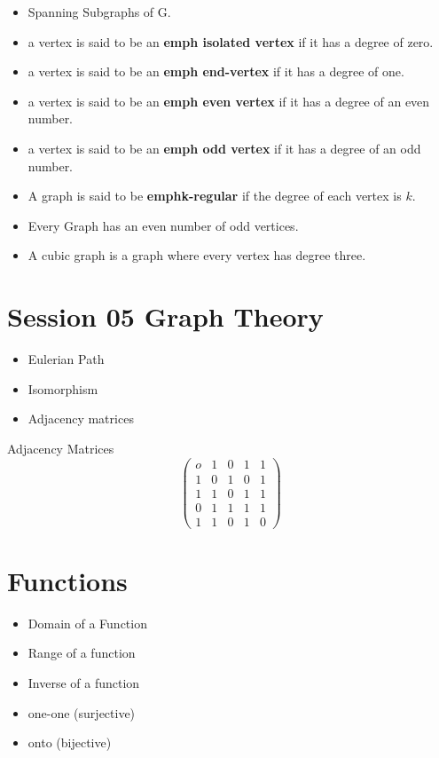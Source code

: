 \documentclass{article}
\begin{document}
\begin{itemize}
\item Spanning Subgraphs of G.

\item a vertex is said to be an \textbf{emph{ isolated vertex}} if it has a degree of zero.
\item a vertex is said to be an \textbf{emph{ end-vertex}} if it has a degree of one.
\item a vertex is said to be an \textbf{emph{ even vertex}} if it has a degree of an even number.
\item a vertex is said to be an \textbf{emph{ odd vertex}} if it has a degree of an odd number.


\item A graph is said to be \textbf{emph{k-regular}} if the degree of each vertex is $k$. 
\item Every Graph has an even number of odd vertices.
\item A cubic graph is a graph where every vertex has degree three.
\end{itemize}



\section*{Session 05 Graph Theory}
\begin{itemize}
\item Eulerian Path
\item Isomorphism
\item Adjacency matrices
\end{itemize}
Adjacency Matrices
\[ \left( \begin{matrix}
o & 1 & 0 & 1 & 1 \\ 
1 & 0 & 1 & 0 & 1 \\ 
1 & 1 & 0 & 1 & 1 \\ 
0 & 1 & 1 & 1 & 1 \\ 
1 & 1 & 0 & 1 & 0
\end{matrix} \right) \]

\section*{Functions}
\begin{itemize}
\item Domain of a Function
\item Range of a function
\item Inverse of a function
\end{itemize}
\begin{itemize}
\item one-one (surjective)
\item onto (bijective)
\end{itemize}
\end{document}
